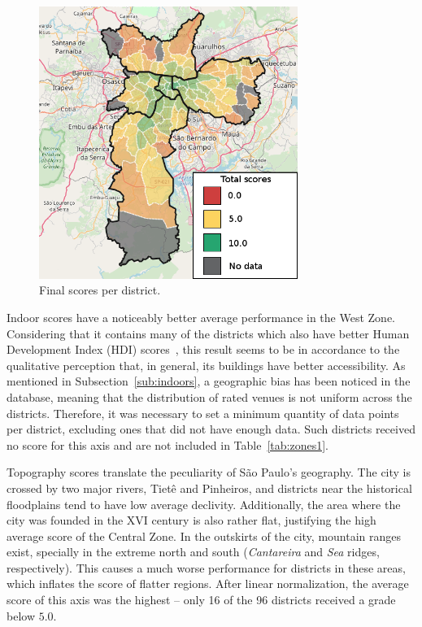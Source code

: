 \documentclass[12pt]{article}
\begin{document}
\begin{figure}[ht]
  \centering
  \includegraphics[width=0.75\textwidth]{map-with-legend.png}
  \caption{Final scores per district.}
  \label{fig:map}
\end{figure}

Indoor scores have a noticeably better average performance in the West Zone.
Considering that it contains many of the districts which also have better
Human Development Index (HDI) scores~\cite{atlas-idh},
this result seems to be in accordance to the qualitative perception that,
in general, its buildings have better accessibility.
As mentioned in Subsection~\ref{sub:indoors},
a geographic bias has been noticed in the database,
meaning that the distribution of rated venues is not uniform across the districts.
Therefore, it was necessary to set a minimum quantity of data points per district,
excluding ones that did not have enough data.
Such districts received no score for this axis
and are not included in Table~\ref{tab:zones1}.

Topography scores translate the peculiarity of São Paulo's geography.
The city is crossed by two major rivers, Tietê and Pinheiros,
and districts near the historical floodplains tend to have low average declivity.
Additionally, the area where the city was founded in the XVI century is also rather flat,
justifying the high average score of the Central Zone.
In the outskirts of the city, mountain ranges exist,
specially in the extreme north and south (\emph{Cantareira} and \emph{Sea} ridges, respectively).
This causes a much worse performance for districts in these areas,
which inflates the score of flatter regions.
After linear normalization, the average score of this axis was the highest
-- only 16 of the 96 districts received a grade below $5.0$.
\end{document}
